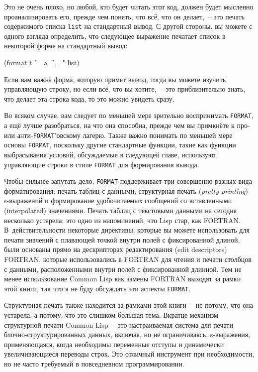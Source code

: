 Это не очень плохо, но любой, кто будет читать этот код, должен будет мысленно
проанализировать его, прежде чем понять, что всё, что он делает,~-- это печать содержимого
списка \lstinline{list} на стандартный вывод. С другой стороны, вы можете с одного взгляда
определить, что следующее выражение печатает список в некоторой форме на стандартный
вывод:

\begin{myverb}
(format t "~{~a~^, ~}" list)
\end{myverb}

Если вам важна форма, которую примет вывод, тогда вы можете изучить управ\-ляю\-щую строку, но
если всё, что вы хотите,~-- это приблизительно знать, что делает эта строка кода, то это
можно увидеть сразу.

Во всяком случае, вам следует по меньшей мере зрительно воспринимать \lstinline{FORMAT}, а ещё
лучше разобраться, на что она способна, прежде чем вы примкнёте к про- или
анти-\lstinline{FORMAT}'овскому лагерю. Также важно понимать по меньшей мере основы
\lstinline{FORMAT}, поскольку другие стандартные функции, такие как функции выбрасывания
условий, обсуждаемые в следующей главе, используют управляющие строки в стиле
\lstinline{FORMAT} для формирования вывода.

Чтобы сильнее запутать дело, \lstinline{FORMAT} поддерживает три совершенно разных вида
форматирования: печать таблиц с данными, структурная печать (\textit{pretty printing})
s-выражений и формирование удобочитаемых сообщений со вставленными (interpolated)
значениями. Печать таблиц с текстовыми данными на сегодня несколько устарела; это одно из
напоминаний, что Lisp стар, как FORTRAN. В~действительности некоторые директивы, которые
вы можете использовать для печати значений с плавающей точкой внутри полей с фиксированной
длиной, были основаны прямо на дескрипторах редактирования (edit descriptors) FORTRAN,
которые использовались в FORTRAN для чтения и печати столбцов с данными, расположенными
внутри полей с фиксированной длинной. Тем не менее использование Common Lisp как замены
FORTRAN выходят за рамки этой книги, так что я не буду обсуждать эти аспекты
\lstinline{FORMAT}.

Структурная печать также находится за рамками этой книги~-- не потому, что она устарела, а
потому, что это слишком большая тема. Вкратце механизм структурной печати Common Lisp~--
это настраиваемая система для печати блочно-структурированных данных, включая, но не
ограничиваясь, s-выражения, применяющаяся, когда необходимы переменные отступы и
динамически увеличивающиеся переводы строк. Это отличный инструмент при необходимости, но
не часто требуемый в повседневном программировании.

